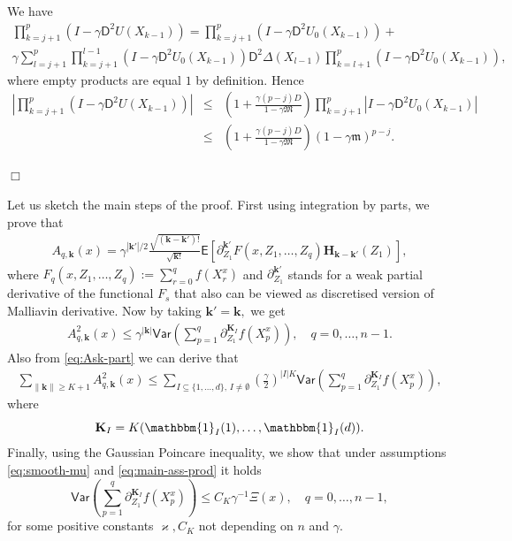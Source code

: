 \documentclass[bj]{imsart}
\def\PVar{\mathsf{Var}}
\newcommand{\proofendsign}{$\Box$}
\newenvironment{proof}{{\noindent \bf Proof }}
 {{\hspace*{\fill}\proofendsign\par\bigskip}}
\newcommand{\indi}[1]{\mathbbm{1}_{#1}}
\begin{document}
\begin{proof}
We have
\begin{multline*}
\prod_{k=j+1}^{p}\left(I-\gamma\mathsf{D}^{2}U(X_{k-1})\right)=\prod_{k=j+1}^{p}\left(I-\gamma\mathsf{D}^{2}U_0(X_{k-1})\right)+
\\
\gamma\sum_{l=j+1}^{p}\prod_{k=j+1}^{l-1}\left(I-\gamma\mathsf{D}^{2}U_{0}(X_{k-1})\right)\mathsf{D}^{2}\Delta(X_{l-1})\prod_{k=l+1}^{p}\left(I-\gamma\mathsf{D}^{2}U_0(X_{k-1})\right),
\end{multline*}
where empty products are equal $1$ by definition.
Hence
\begin{eqnarray*}
\left|\prod_{k=j+1}^{p}\left(I-\gamma\mathsf{D}^{2}U(X_{k-1})\right)\right|&\leq &\left(1+\frac{\gamma (p-j) D}{1-\gamma\mathfrak{M}}\right)\prod_{k=j+1}^{p}\left |I-\gamma\mathsf{D}^{2}U_0(X_{k-1})\right|
\\
&\leq &  \left(1+\frac{\gamma (p-j) D}{1-\gamma\mathfrak{M}}\right) (1-\gamma \mathfrak{m})^{p-j}.
\end{eqnarray*}

\end{proof}

Let us sketch the main steps of the proof. First using integration by parts, we prove that
\begin{eqnarray}
\label{eq:Ask-part}
A_{q,\mathbf{k}}(x)=\gamma^{|\mathbf{k}'|/2}\frac{\sqrt{(\mathbf{k}-\mathbf{k}')!}}{\sqrt{\mathbf{k}!}}\mathsf{E}\left[ \partial_{Z_1}^{\mathbf{k}'} F(x,Z_1,\ldots,Z_q) \mathbf{H}_{\mathbf{k}-\mathbf{k}'}(Z_{1})\right],
\end{eqnarray}
where $F_q(x,Z_1,\ldots,Z_q):=\sum_{r=0}^q f(X^x_r)$ and $\partial_{Z_1}^{\mathbf{k}'}$
stands for a weak partial derivative of the functional $F_s$ that also can be viewed as discretised version of Malliavin derivative.
Now by taking $\mathbf{k}'=\mathbf{k},$ we get
\begin{eqnarray*}
A^2_{q,\mathbf{k}}(x)\leq \gamma^{|\mathbf{k}|} \PVar \left( \sum_{p=1}^{q}\partial_{Z_{1}}^{\mathbf{K}_I}f\left(X_{p}^x\right)
\right),\quad q=0,\ldots,n-1.
\end{eqnarray*}
Also from \eqref{eq:Ask-part} we can derive that
\begin{eqnarray*}
\sum_{\|\mathbf{k}\|\geq K+1} A^2_{q,\mathbf{k}}(x)\leq \sum_{I\subseteq\{1,\ldots,d\},\, I\neq \emptyset}
\left(\frac{\gamma}{2}\right)^{|I|K}
\PVar \left( \sum_{p=1}^{q}\partial_{Z_{1}}^{\mathbf{K}_I}f\left(X_{p}^x\right)
\right),
\end{eqnarray*}
where
\[
\mathbf{\mathbf{K}}_{I}=K(\indi{I}(1),\ldots, \indi{I}(d)).
\]
Finally, using the Gaussian Poincare inequality, we show  that under  assumptions \eqref{eq:smooth-mu} and  \eqref{eq:main-ass-prod} it holds
\begin{equation}
\label{eq:varboundV}
\PVar \left(\sum_{p=1}^{q}\partial_{Z_{1}}^{\mathbf{K}_I}f\left(X^x_{p}\right)
\right)\leq C_{K}\gamma^{-1}\Xi(x),\quad q=0,\ldots,n-1,
\end{equation}
for some positive constants $\varkappa, C_K$ not depending on $n$ and  $\gamma.$
\end{document}
